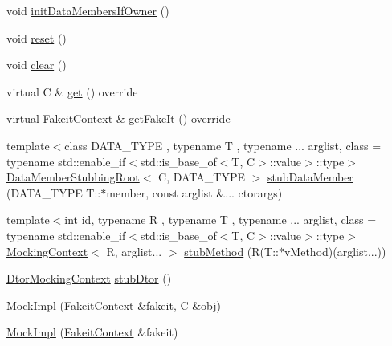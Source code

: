 \begin{DoxyCompactItemize}
\item 
void \mbox{\hyperlink{classfakeit_1_1MockImpl_ad403c33f4734e31196ead952fc4c4805}{init\+Data\+Members\+If\+Owner}} ()
\item 
void \mbox{\hyperlink{classfakeit_1_1MockImpl_aad69a9c36fc64d0890f21ff15318a206}{reset}} ()
\item 
void \mbox{\hyperlink{classfakeit_1_1MockImpl_a3985505d2ec7bd50a5d71f155c5ae458}{clear}} ()
\item 
virtual C \& \mbox{\hyperlink{classfakeit_1_1MockImpl_a8f287e857fde9a0941c618ff5459bd88}{get}} () override
\item 
virtual \mbox{\hyperlink{structfakeit_1_1FakeitContext}{Fakeit\+Context}} \& \mbox{\hyperlink{classfakeit_1_1MockImpl_a1b51dd1918a32ec5d450fc804ad37e63}{get\+Fake\+It}} () override
\item 
{\footnotesize template$<$class D\+A\+T\+A\+\_\+\+T\+Y\+PE , typename T , typename ... arglist, class  = typename std\+::enable\+\_\+if$<$std\+::is\+\_\+base\+\_\+of$<$\+T, C$>$\+::value$>$\+::type$>$ }\\\mbox{\hyperlink{classfakeit_1_1DataMemberStubbingRoot}{Data\+Member\+Stubbing\+Root}}$<$ C, D\+A\+T\+A\+\_\+\+T\+Y\+PE $>$ \mbox{\hyperlink{classfakeit_1_1MockImpl_acaa4bcb3984d3ca5fd1ecb3095393951}{stub\+Data\+Member}} (D\+A\+T\+A\+\_\+\+T\+Y\+PE T\+::$\ast$member, const arglist \&... ctorargs)
\item 
{\footnotesize template$<$int id, typename R , typename T , typename ... arglist, class  = typename std\+::enable\+\_\+if$<$std\+::is\+\_\+base\+\_\+of$<$\+T, C$>$\+::value$>$\+::type$>$ }\\\mbox{\hyperlink{classfakeit_1_1MockingContext}{Mocking\+Context}}$<$ R, arglist... $>$ \mbox{\hyperlink{classfakeit_1_1MockImpl_a603befd40e35ea88c7efee965f15bb60}{stub\+Method}} (R(T\+::$\ast$v\+Method)(arglist...))
\item 
\mbox{\hyperlink{classfakeit_1_1DtorMockingContext}{Dtor\+Mocking\+Context}} \mbox{\hyperlink{classfakeit_1_1MockImpl_ae64cb908c91a96faefbf0fabac948f29}{stub\+Dtor}} ()
\item 
\mbox{\hyperlink{classfakeit_1_1MockImpl_aeabb99e36f2ef5fea7856db165fe01d3}{Mock\+Impl}} (\mbox{\hyperlink{structfakeit_1_1FakeitContext}{Fakeit\+Context}} \&fakeit, C \&obj)
\item 
\mbox{\hyperlink{classfakeit_1_1MockImpl_ae6f86001c16b110046453433ba2d36e8}{Mock\+Impl}} (\mbox{\hyperlink{structfakeit_1_1FakeitContext}{Fakeit\+Context}} \&fakeit)
\item 

\end{DoxyCompactItemize}

